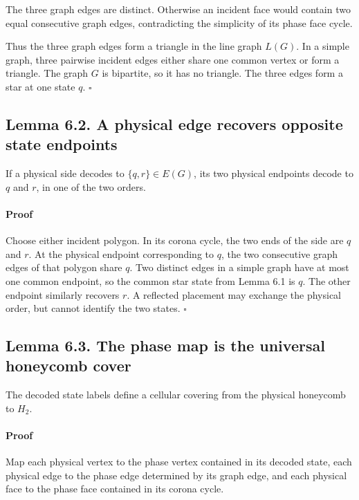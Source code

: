 \documentclass[11pt]{article}
\begin{document}
The three graph edges are distinct. Otherwise an incident face would contain
two equal consecutive graph edges, contradicting the simplicity of its phase
face cycle.

Thus the three graph edges form a triangle in the line graph \(L(G)\). In a
simple graph, three pairwise incident edges either share one common vertex or
form a triangle. The graph \(G\) is bipartite, so it has no triangle. The
three edges form a star at one state \(q\). \(\square\)

\subsection*{Lemma 6.2. A physical edge recovers opposite state endpoints}

If a physical side decodes to \(\{q,r\}\in E(G)\), its two physical endpoints
decode to \(q\) and \(r\), in one of the two orders.

\paragraph{Proof}

Choose either incident polygon. In its corona cycle, the two ends of the side
are \(q\) and \(r\). At the physical endpoint corresponding to \(q\), the two
consecutive graph edges of that polygon share \(q\). Two distinct edges in a
simple graph have at most one common endpoint, so the common star state from
Lemma 6.1 is \(q\). The other endpoint similarly recovers \(r\). A reflected
placement may exchange the physical order, but cannot identify the two
states. \(\square\)

\subsection*{Lemma 6.3. The phase map is the universal honeycomb cover}

The decoded state labels define a cellular covering from the physical
honeycomb to \(H_2\).

\paragraph{Proof}

Map each physical vertex to the phase vertex contained in its decoded state,
each physical edge to the phase edge determined by its graph edge, and each
physical face to the phase face contained in its corona cycle.
\end{document}
